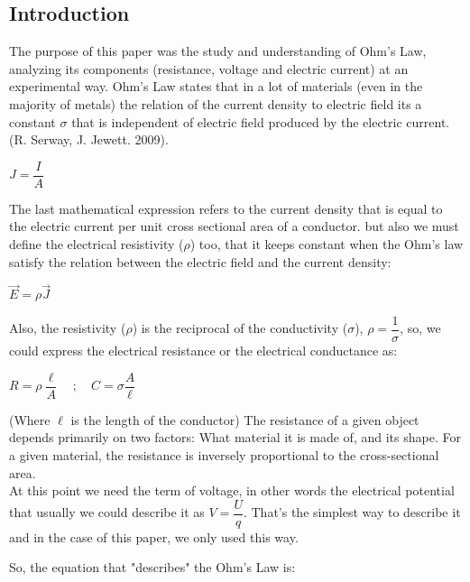 \documentclass[a4paper,10pt]{article}
\begin{document}
\begin{multicols}{2}
\section{\textcolor{MiColor1}{\textbf{Introduction}}}
The purpose of this paper was the study and understanding of Ohm's Law, analyzing its components (resistance, voltage and electric current) at an experimental way. Ohm's Law states that in a lot of materials (even in the majority of metals) the relation of the current density to electric field its a constant $\sigma$ that is independent of electric field produced by the electric current. (R. Serway, J. Jewett. 2009)\cite{1}. \par
\vspace{2mm}
\centerline{$J=\dfrac{I}{A}$}
\vspace{2mm}
The last mathematical expression refers to the current density that is equal to the electric current per unit cross sectional area of a conductor. but also we must define the electrical resistivity ($\rho$) too, that it keeps constant when the Ohm's law satisfy the relation between the electric field and the current density: \par
\vspace{2mm}
\centerline{$\Vec{E}=\rho \Vec{J}$}
\vspace{2mm}
Also, the resistivity ($\rho$) is the reciprocal of the conductivity ($\sigma$), $\rho =\dfrac{1}{\sigma}$, \hspace{0.2em} so, we could express the electrical resistance or the electrical conductance as: \par
\vspace{2mm}
\centerline{$R=\rho \dfrac{\ell}{A}\hspace{1em};\hspace{1em}C=\sigma \dfrac{A}{\ell}$}
\vspace{2mm}
(Where $\ell$ is the length of the conductor) The resistance of a given object depends primarily on two factors: What material it is made of, and its shape. For a given material, the resistance is inversely proportional to the cross-sectional area. \cite{8} \\
At this point we need the term of voltage, in other words the electrical potential that usually we could describe it as $V=\dfrac{U}{q}$. That's the simplest way to describe it and in the case of this paper, we only used this way. \par
So, the equation that "describes" the Ohm's Law is: \par

\end{multicols}
\end{document}
